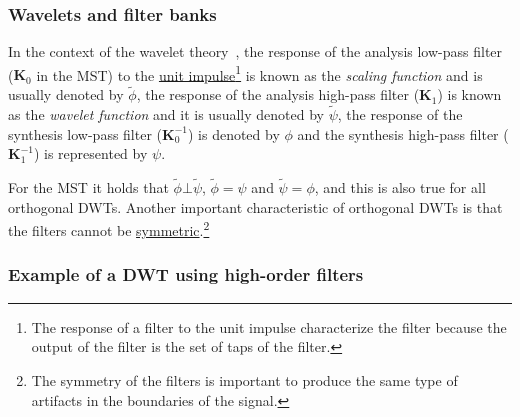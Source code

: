 
\subsubsection{Wavelets and filter banks}

In the context of the wavelet theory~\cite{burrus2013wavelets}, the
response of the analysis low-pass filter (${\mathbf K}_0$ in the MST)
to the
\href{https://en.wikipedia.org/?title=Unit_impulse&redirect=no}{unit
  impulse}\footnote{The response of a filter to the unit impulse
characterize the filter because the output of the filter is the set of
taps of the filter.} is known as the \emph{scaling function} and is
usually denoted by $\tilde\phi$, the response of the analysis
high-pass filter (${\mathbf K}_1$) is known as the \emph{wavelet
function} and it is usually denoted by $\tilde\psi$, the response of
the synthesis low-pass filter (${\mathbf K}^{-1}_0$) is denoted by
$\phi$ and the synthesis high-pass filter (${\mathbf K}^{-1}_1$) is
represented by $\psi$.

For the MST it holds that $\tilde\phi\bot\tilde\psi$,
$\tilde\phi=\psi$ and $\tilde\psi=\phi$, and this is also true for all
orthogonal DWTs. Another important characteristic of orthogonal DWTs
is that the filters cannot be
\href{https://en.wikipedia.org/wiki/Symmetry}{symmetric}.\footnote{The
symmetry of the filters is important to produce the same type of
artifacts in the boundaries of the signal.}



\subsubsection{Example of a DWT using high-order filters}

